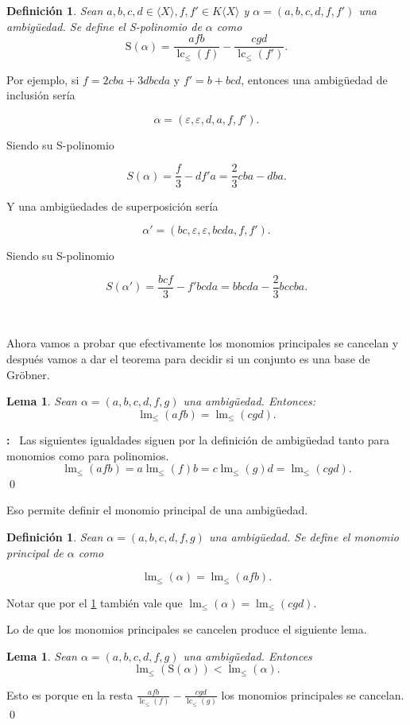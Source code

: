 \documentclass[12pt]{report}
\theoremstyle{customstyle}
\newtheorem{definition}[theorem]{Definición}
\newtheorem{lemma}[theorem]{Lema}
\renewenvironment{proof}[1][\proofname]{{\noindent \bfseries #1: }}{\qed} %
\theoremstyle{factstyle}
\DeclareMathOperator{\lm}{lm}
\DeclareMathOperator{\lc}{lc}
\renewcommand{\S}{\text{S}}
\begin{document}
\begin{definition}
  Sean $a, b, c, d ∈ ⟨X⟩, f, f' ∈ K⟨X⟩$ y $α = (a, b, c, d, f, f')$ una ambigüedad. Se define el S-polinomio de $α$ como
  \[ \S(α) = \frac{afb}{\lc_≤{(f)}} - \frac{cgd}{\lc_≤{(f')}} \text{.}\]
\end{definition}

Por ejemplo, si $f = 2 cba + 3 dbcda$ y $f' = b + bcd$, entonces una ambigüedad de inclusión sería

\[α = (ε, ε, d, a, f, f') \text{.} \]

\noindent Siendo su S-polinomio

\[S(α) = \frac{f}{3} - d f' a = \frac{2}{3} cba - dba  \text{.} \]

\noindent Y una ambigüedades de superposición sería

\[ α' = (bc, ε, ε, bcda, f, f') \text{.} \]

\noindent Siendo su S-polinomio

\[ S(α') = \frac{bc f}{3} - f' bcda = bbcda - \frac{2}{3} bccba \text{.} \]

\

Ahora vamos a probar que efectivamente los monomios principales se cancelan y después vamos a dar el teorema para decidir si un conjunto es una base de Gröbner.

\begin{lemma}\label{lemma:lm ambs}
  Sean $α = (a, b, c, d, f, g)$ una ambigüedad. Entonces:
  \[ \lm_≤{(afb)} = \lm_≤{(cgd)} \text{.}\]
\end{lemma}
\begin{proof}\
  Las siguientes igualdades siguen por la definición de ambigüedad tanto para monomios como para polinomios.
  \[ \lm_≤{(afb)} = a\lm_≤{(f)}b = c\lm_≤{(g)}d = \lm_≤{(cgd)} \text{.} \]
\end{proof}

Eso permite definir el monomio principal de una ambigüedad.

\begin{definition}
  Sean $α = (a, b, c, d, f, g)$ una ambigüedad. Se define el monomio principal de $α$ como

  \[ \lm_≤(α) = \lm_≤(afb) \text{.}\]
\end{definition}

Notar que por el \cref{lemma:lm ambs} también vale que $\lm_≤(α) = \lm_≤(cgd)$.

Lo de que los monomios principales se cancelen produce el siguiente lema.

\begin{lemma}
  Sean $α = (a, b, c, d, f, g)$ una ambigüedad. Entonces
  \[ \lm_≤(\S(α)) < \lm_≤(α) \text{.}\]
\end{lemma}
\begin{proof}
  Esto es porque en la resta $\frac{afb}{\lc_≤(f)} - \frac{cgd}{\lc_≤(g)}$ los monomios principales se cancelan.
\end{proof}
\end{document}
